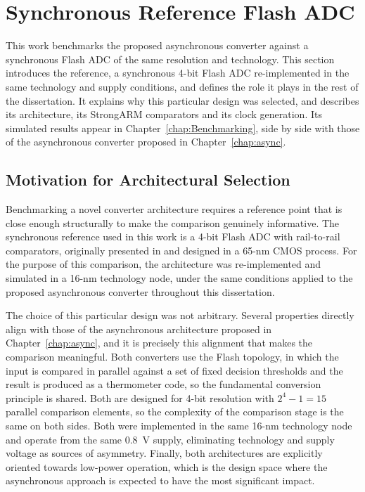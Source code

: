 

\section{Synchronous Reference Flash ADC} \label{chap:synchronous}

This work benchmarks the proposed asynchronous converter against a synchronous Flash ADC of the same resolution and technology. This section introduces the reference, a synchronous 4-bit Flash ADC re-implemented in the same technology and supply conditions, and defines the role it plays in the rest of the dissertation. It explains why this particular design was selected, and describes its architecture, its StrongARM comparators and its clock generation. Its simulated results appear in Chapter~\ref{chap:Benchmarking}, side by side with those of the asynchronous converter proposed in Chapter~\ref{chap:async}.

\subsection{Motivation for Architectural Selection}

Benchmarking a novel converter architecture requires a reference point that is close enough structurally to make the comparison genuinely informative. The synchronous reference used in this work is a 4-bit Flash ADC with rail-to-rail comparators, originally presented in \cite{flashadc_ref} and designed in a 65-nm CMOS process.
For the purpose of this comparison, the architecture was re-implemented and simulated in a 16-nm technology node, under the same conditions applied to the proposed asynchronous converter throughout this dissertation.

The choice of this particular design was not arbitrary. Several properties directly align with those of the asynchronous architecture proposed in Chapter~\ref{chap:async}, and it is precisely this alignment that makes the comparison meaningful. Both converters use the Flash topology, in which the input is compared in parallel against a set of fixed decision thresholds and the result is produced as a thermometer code, so the fundamental conversion principle is shared. Both are designed for 4-bit resolution with $2^4-1 = 15$ parallel comparison elements, so the complexity of the comparison stage is the same on both sides. Both were implemented in the same 16-nm technology node and operate from the same $0.8$~V supply, eliminating technology and supply voltage as sources of asymmetry. Finally, both architectures are explicitly oriented towards low-power operation, which is the design space where the asynchronous approach is expected to have the most significant impact.

